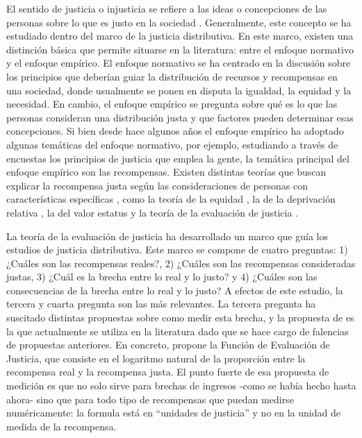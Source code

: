 \documentclass[12pt,twoside]{templates/facsothesis}
\begin{document}
El sentido de justicia o injusticia se refiere a las ideas o concepciones de las personas sobre lo que es justo en la sociedad \citep{Jasso2005}. Generalmente, este concepto se ha estudiado dentro del marco de la justicia distributiva. En este marco, existen una distinción básica que permite situarse en la literatura: entre el enfoque normativo y el enfoque empírico. El enfoque normativo se ha centrado en la discusión sobre los principios que deberían guiar la distribución de recursos y recompensas en una sociedad, donde usualmente se ponen en disputa la igualdad, la equidad y la necesidad. En cambio, el enfoque empírico se pregunta sobre qué es lo que las personas consideran una distribución justa y que factores pueden determinar esas concepciones. Si bien desde hace algunos años el enfoque empírico ha adoptado algunas temáticas del enfoque normativo, por ejemplo, estudiando a través de encuestas los principios de justicia que emplea la gente, la temática principal del enfoque empírico son las recompensas. Existen distintas teorías que buscan explicar la recompensa justa según las consideraciones de personas con características específicas \citep{Castillo2011}, como la teoría de la equidad \citep{Adams1963, Homans1961}, la de la deprivación relativa \citep{Runciman1966}, la del valor estatus \citep{Berger1989} y la teoría de la evaluación de justicia \citep{Jasso1980}.

La teoría de la evaluación de justicia ha desarrollado un marco que guía los estudios de justicia distributiva. Este marco se compone de cuatro preguntas: 1) ¿Cuáles son las recompensas reales?, 2) ¿Cuáles son las recompensas consideradas justas, 3) ¿Cuál es la brecha entre lo real y lo justo? y 4) ¿Cuáles son las consecuencias de la brecha entre lo real y lo justo? A efectos de este estudio, la tercera y cuarta pregunta son las más relevantes. La tercera pregunta ha suscitado distintas propuestas sobre como medir esta brecha, y la propuesta de \citet{Jasso1980} es la que actualmente se utiliza en la literatura dado que se hace cargo de falencias de propuestas anteriores. En concreto, \citet{Jasso1980} propone la Función de Evaluación de Justicia, que consiste en el logaritmo natural de la proporción entre la recompensa real y la recompensa justa. El punto fuerte de esa propuesta de medición es que no solo sirve para brechas de ingresos -como se había hecho hasta ahora- sino que para todo tipo de recompensas que puedan medirse numéricamente: la formula está en ``unidades de justicia'' y no en la unidad de medida de la recompensa.
\end{document}
